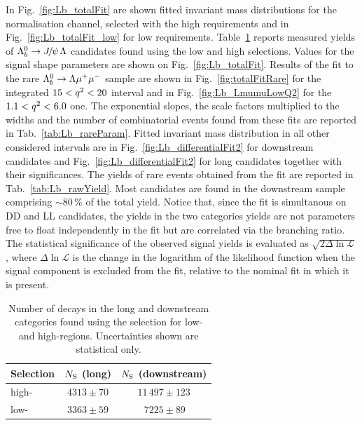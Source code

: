 %
In Fig.~\ref{fig:Lb_totalFit} are shown fitted invariant mass distributions for the normalisation channel,
selected with the high \qsq requirements and in Fig.~\ref{fig:Lb_totalFit_low} for low \qsq requirements.
Table~\ref{tab:Lb_rawYieldJpsi} reports measured yields of $\Lb\ra\jpsi\Lz$ candidates found using the low and high \qsq selections.
Values for the signal shape parameters are shown on Fig.~\ref{fig:Lb_totalFit}.
Results of the fit to the rare $\Lambda^0_b\rightarrow\Lambda\mu^+\mu^-$ sample are shown in Fig.~\ref{fig:totalFitRare} for the integrated
$15 < q^2 < 20$ \gevgevcccc interval and in Fig.~\ref{fig:Lb_LmumuLowQ2} for the $1.1 < q^2 < 6.0$ \gevgevcccc one.
The exponential slopes, the scale factors multiplied to the widths and the number of combinatorial events
found from these fits are reported in Tab.~\ref{tab:Lb_rareParam}.
Fitted invariant mass distribution in all other considered \qsq intervals are in Fig.~\ref{fig:Lb_differentialFit2}
for downstream candidates and Fig.~\ref{fig:Lb_differentialFit2} for long candidates together with their significances.
The yields of rare events obtained from the fit are reported in Tab.~\ref{tab:Lb_rawYield}.
Most candidates are found in the downstream sample comprising $\sim 80\,\%$ of the total yield.
Notice that, since the fit is simultanous on DD and LL candidates, the yields in the two categories yields
are not parameters free to float independently in the fit but are correlated via the branching ratio.
The statistical significance of the observed signal yields is evaluated as $\sqrt{2\Delta\ln{\mathcal{L}}}$, where
$\Delta\ln{\mathcal{L}}$ is the change in the logarithm of the likelihood function when the signal component
is excluded from the fit, relative to the nominal fit in which it is present.

\begin{table}
\centering
\caption{Number of \decay{\Lb}{\jpsi\Lz} decays in the long and
  downstream categories found using the selection for low- and
  high-\qsq regions. Uncertainties shown are statistical only.}
\begin{tabular}{lcc}
Selection & $N_{\rm S}$ (long) & $N_{\rm S}$ (downstream)\\ \hline
high-\qsq	& $4313 \pm 70$	 	&  $11\,497 \pm 123$ \\
low-\qsq	& $3363 \pm 59$ 	&  $\phantom{0}\,7225 \pm 89\phantom{0}$  \\
 \hline
\end{tabular}
\label{tab:Lb_rawYieldJpsi}
\end{table}



